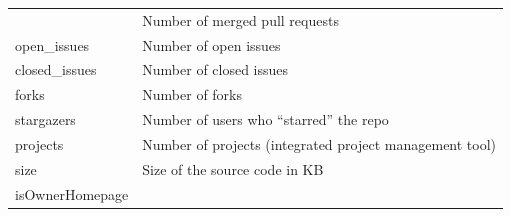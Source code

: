 \documentclass{article}
\begin{document}
\begin{longtable}[]{@{}ll@{}}
\begin{minipage}[t]{0.17\columnwidth}
\end{minipage} & \begin{minipage}[t]{0.16\columnwidth}\raggedright\strut
Number of merged pull requests\strut
\end{minipage}\tabularnewline
\begin{minipage}[t]{0.17\columnwidth}\raggedright\strut
open\_issues\strut
\end{minipage} & \begin{minipage}[t]{0.16\columnwidth}\raggedright\strut
Number of open issues\strut
\end{minipage}\tabularnewline
\begin{minipage}[t]{0.17\columnwidth}\raggedright\strut
closed\_issues\strut
\end{minipage} & \begin{minipage}[t]{0.16\columnwidth}\raggedright\strut
Number of closed issues\strut
\end{minipage}\tabularnewline
\begin{minipage}[t]{0.17\columnwidth}\raggedright\strut
forks\strut
\end{minipage} & \begin{minipage}[t]{0.16\columnwidth}\raggedright\strut
Number of forks\strut
\end{minipage}\tabularnewline
\begin{minipage}[t]{0.17\columnwidth}\raggedright\strut
stargazers\strut
\end{minipage} & \begin{minipage}[t]{0.16\columnwidth}\raggedright\strut
Number of users who ``starred'' the repo\strut
\end{minipage}\tabularnewline
\begin{minipage}[t]{0.17\columnwidth}\raggedright\strut
projects\strut
\end{minipage} & \begin{minipage}[t]{0.16\columnwidth}\raggedright\strut
Number of projects (integrated project management tool)\strut
\end{minipage}\tabularnewline
\begin{minipage}[t]{0.17\columnwidth}\raggedright\strut
size\strut
\end{minipage} & \begin{minipage}[t]{0.16\columnwidth}\raggedright\strut
Size of the source code in KB\strut
\end{minipage}\tabularnewline
\begin{minipage}[t]{0.17\columnwidth}\raggedright\strut
isOwnerHomepage\strut

\end{minipage}
\end{longtable}
\end{document}
